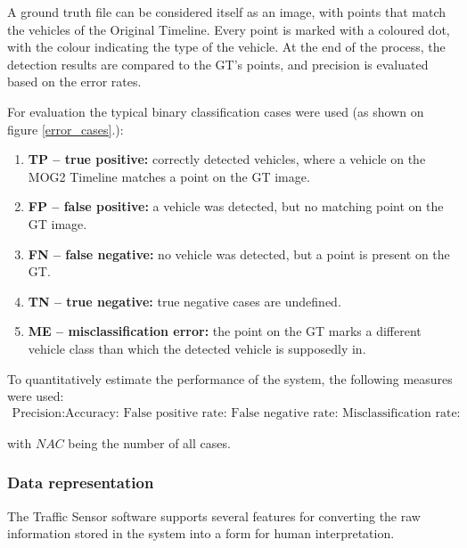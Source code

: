 A ground truth file can be considered itself as an image, with points that match the vehicles of the Original Timeline.
Every point is marked with a coloured dot, with the colour indicating the type of the vehicle.
At the end of the process, the detection results are compared to the GT's  points, and precision is evaluated based on the error rates.

\begin{figure}[!h]
	\centering
	
	\caption{ \label{fig:error_cases}}
\end{figure}

For evaluation the typical binary classification cases were used (as shown on figure \ref{error_cases}.):
\begin{enumerate}
\item \textbf{TP -- true positive:} correctly detected vehicles, where a vehicle on the MOG2 Timeline matches a point on the GT image.
\item \textbf{FP -- false positive:} a vehicle was detected, but no matching point on the GT image.
\item \textbf{FN -- false negative:} no vehicle was detected, but a point is present on the GT. 
\item \textbf{TN -- true negative:} true negative cases are undefined.
\item  \textbf{ME -- misclassification error:} the point on the GT marks a different vehicle class than which the detected vehicle is supposedly in.
\end{enumerate}

To quantitatively estimate the performance of the system, the following measures were used:
\begin{gather}
	\text{Precision:}
	\text{Accuracy: }
	\text{False positive rate: }
	\text{False negative rate: }
	\text{Misclassification rate: }
\end{gather}

with $NAC$ being the number of all cases.
\subsubsection{Data representation}
The Traffic Sensor software supports several features for converting the raw information stored in the system into a form for human interpretation.

